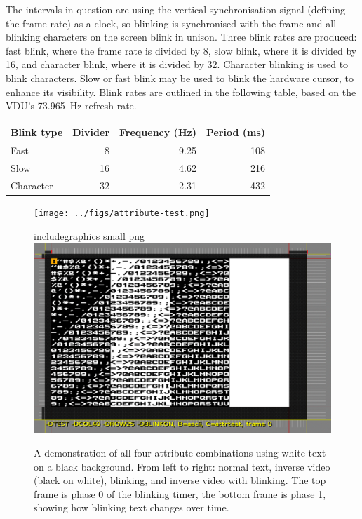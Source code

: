 The intervals in question are using the vertical synchronisation
signal (defining the frame rate) as a clock, so blinking is
synchronised with the frame and all blinking characters on the screen
blink in unison. Three blink rates are produced: fast blink, where the
frame rate is divided by 8, slow blink, where it is divided by 16, and
character blink, where it is divided by 32. Character blinking is used
to blink characters. Slow or fast blink may be used to blink the
hardware cursor, to enhance its visibility. Blink rates are outlined
in the following table, based on the VDU's 73.965~Hz refresh rate.

\begin{tabular}{lrrr}
  Blink type & Divider & Frequency (Hz) & Period (ms) \\
  \hline
  Fast       &   8   &   9.25   &   108 \\
  Slow       &  16   &   4.62   &   216 \\
  Character  &  32   &   2.31   &   432 \\
  \hline
\end{tabular}


\begin{figure}
  \centering
  \ifxetex
    \texttt{[image: ../figs/attribute-test.png]}
  \else
    \begin{htmldiv}{includegraphics small png}%
      \includegraphics{../figs/attribute-test.gif}%
    \end{htmldiv}%
  \fi
  \caption[Demonstration of Attributes]{\label{fig:attributes}A demonstration
    of all four attribute combinations using white text on a black
    background. From left to right: normal text, inverse video (black on
    white), blinking, and inverse video with blinking. The top frame is phase 0 of the
    blinking timer, the bottom frame is phase 1, showing how blinking text
    changes over time.}
\end{figure}


